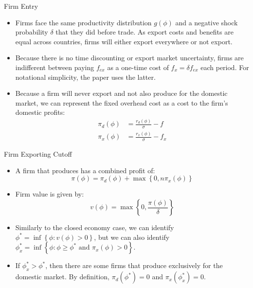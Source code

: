 \documentclass[aspectratio=169]{beamer}
\begin{document}
\begin{frame}{Firm Entry}

\begin{itemize}
    \item<1-> Firms face the same productivity distribution $ g\left( \phi \right) $ and a negative shock probability $ \delta $ that they did before trade.  As export costs and benefits are equal across countries, firms will either export everywhere or not export.
    \item<2-> Because there is no time discounting or export market uncertainty, firms are indifferent between paying $ f_{ex} $ as a one-time cost of $ f_{x} = \delta f_{ex} $ each period.  For notational simplicity, the paper uses the latter.
    \item<3-> Because a firm will never export and not also produce for the domestic market, we can represent the fixed overhead cost as a cost to the firm’s domestic profits:
    \begin{equation*}
        \begin{split}
            \pi_{d}\left( \phi \right) &= \frac{r_{d}\left( \phi \right)}{\sigma} - f \\
            \pi_{x}\left( \phi \right) &= \frac{r_{x}\left( \phi \right)}{\sigma} - f_{x}
        \end{split}
    \end{equation*}
\end{itemize}
    
\end{frame}


\begin{frame}{Firm Exporting Cutoff}

\begin{itemize}
    \item<1-> A firm that produces has a combined profit of:
    \begin{equation*}
        \pi\left( \phi \right) = \pi_{d}\left( \phi \right) + \max\left\{ 0, n\pi_{x}\left( \phi \right) \right\}
    \end{equation*}
    \item<2-> Firm value is given by:
    \begin{equation*}
        v\left( \phi \right) = \max \left\{ 0, \frac{\pi\left( \phi \right)}{\delta} \right\}
    \end{equation*}
    \item<3-> Similarly to the closed economy case, we can identify $ \phi^{*} = \inf \left\{ \phi : v\left( \phi \right) > 0 \right\} $, but we can also identify $ \phi_{x}^{*} = \inf \left\{ \phi : \phi \ge \phi^{*} \text{ and } \pi_{x}\left( \phi \right) > 0 \right\} $.
    \item<4-> If $ \phi_{x}^{*} > \phi^{*} $, then there are some firms that produce exclusively for the domestic market.  By definition, $ \pi_{d}\left( \phi^{*} \right) = 0 $ and $ \pi_{x}\left( \phi_{x}^{*} \right) = 0 $.
\end{itemize}
    
\end{frame}
\end{document}

